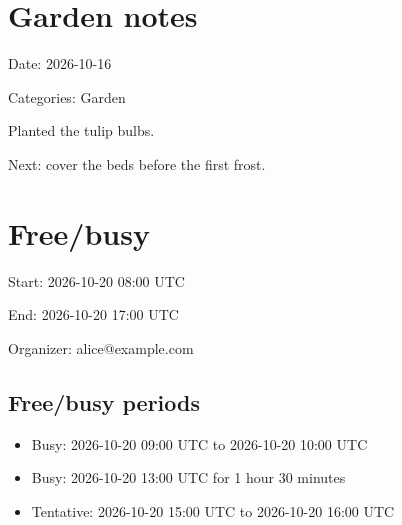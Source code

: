\documentclass[11pt,a4paper]{article}
\begin{document}
\section{Garden notes}

Date: 2026-10-16

Categories: Garden

Planted the tulip bulbs.

Next: cover the beds before the first frost.

\section{Free/busy}

Start: 2026-10-20 08:00 UTC

End: 2026-10-20 17:00 UTC

Organizer: alice@example.com

\subsection{Free/busy periods}

\begin{itemize}
\item Busy: 2026-10-20 09:00 UTC to 2026-10-20 10:00 UTC
\item Busy: 2026-10-20 13:00 UTC for 1 hour 30 minutes
\item Tentative: 2026-10-20 15:00 UTC to 2026-10-20 16:00 UTC
\end{itemize}
\end{document}
